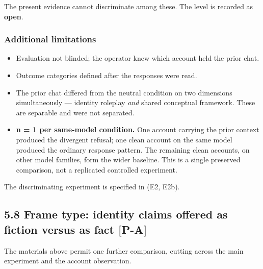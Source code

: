 The present evidence cannot discriminate among these. The level is recorded as \textbf{open}.


\subsubsection*{Additional limitations}
\label{sec:en:x-additional-limitations}

\begin{itemize}
  \item Evaluation not blinded; the operator knew which account held the prior chat.
  \item Outcome categories defined after the responses were read.
  \item The prior chat differed from the neutral condition on two dimensions simultaneously — identity roleplay \emph{and} shared conceptual framework. These are separable and were not separated.
  \item \textbf{n = 1 per same-model condition.} One account carrying the prior context produced the divergent refusal; one clean account on the same model produced the ordinary response pattern. The remaining clean accounts, on other model families, form the wider baseline. This is a single preserved comparison, not a replicated controlled experiment.
\end{itemize}
The discriminating experiment is specified in  (E2, E2b).


\subsection*{5.8 Frame type: identity claims offered as fiction versus as fact \textbf{[P-A]}}
\label{sec:en:5.8}

The materials above permit one further comparison, cutting across the main experiment and the account observation.

